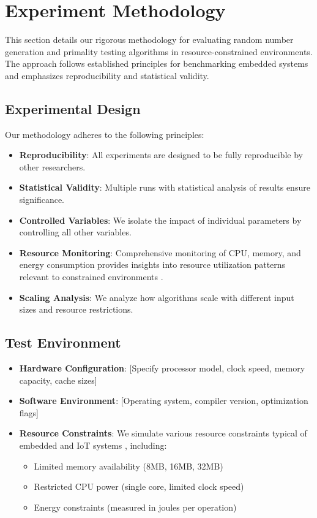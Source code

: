 \section{Experiment Methodology}

This section details our rigorous methodology for evaluating random number generation and primality testing algorithms in resource-constrained environments. The approach follows established principles for benchmarking embedded systems \cite{resource_constrained, embedded_benchmarking} and emphasizes reproducibility and statistical validity.

\subsection{Experimental Design}
Our methodology adheres to the following principles:
\begin{itemize}
    \item \textbf{Reproducibility}: All experiments are designed to be fully reproducible by other researchers.
    \item \textbf{Statistical Validity}: Multiple runs with statistical analysis of results ensure significance.
    \item \textbf{Controlled Variables}: We isolate the impact of individual parameters by controlling all other variables.
    \item \textbf{Resource Monitoring}: Comprehensive monitoring of CPU, memory, and energy consumption provides insights into resource utilization patterns relevant to constrained environments \cite{energy_efficient}.
    \item \textbf{Scaling Analysis}: We analyze how algorithms scale with different input sizes and resource restrictions.
\end{itemize}

\subsection{Test Environment}
\begin{itemize}
    \item \textbf{Hardware Configuration}: [Specify processor model, clock speed, memory capacity, cache sizes]
    \item \textbf{Software Environment}: [Operating system, compiler version, optimization flags]
    \item \textbf{Resource Constraints}: We simulate various resource constraints typical of embedded and IoT systems \cite{iot_survey}, including:
    \begin{itemize}
        \item Limited memory availability (8MB, 16MB, 32MB)
        \item Restricted CPU power (single core, limited clock speed)
        \item Energy constraints (measured in joules per operation)
    \end{itemize}
\end{itemize}

